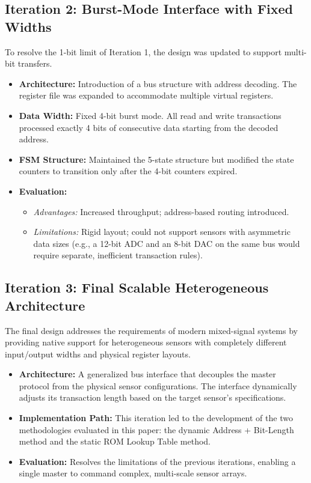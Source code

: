 \documentclass[conference]{IEEEtran}
\begin{document}
\subsection{Iteration 2: Burst-Mode Interface with Fixed Widths}
To resolve the 1-bit limit of Iteration 1, the design was updated to support multi-bit transfers.
\begin{itemize}
    \item \textbf{Architecture:} Introduction of a bus structure with address decoding. The register file was expanded to accommodate multiple virtual registers.
    \item \textbf{Data Width:} Fixed 4-bit burst mode. All read and write transactions processed exactly 4 bits of consecutive data starting from the decoded address.
    \item \textbf{FSM Structure:} Maintained the 5-state structure but modified the state counters to transition only after the 4-bit counters expired.
    \item \textbf{Evaluation:} 
        \begin{itemize}
            \item \textit{Advantages:} Increased throughput; address-based routing introduced.
            \item \textit{Limitations:} Rigid layout; could not support sensors with asymmetric data sizes (e.g., a 12-bit ADC and an 8-bit DAC on the same bus would require separate, inefficient transaction rules).
        \end{itemize}
\end{itemize}

\subsection{Iteration 3: Final Scalable Heterogeneous Architecture}
The final design addresses the requirements of modern mixed-signal systems by providing native support for heterogeneous sensors with completely different input/output widths and physical register layouts.
\begin{itemize}
    \item \textbf{Architecture:} A generalized bus interface that decouples the master protocol from the physical sensor configurations. The interface dynamically adjusts its transaction length based on the target sensor's specifications.
    \item \textbf{Implementation Path:} This iteration led to the development of the two methodologies evaluated in this paper: the dynamic Address + Bit-Length method and the static ROM Lookup Table method.
    \item \textbf{Evaluation:} Resolves the limitations of the previous iterations, enabling a single master to command complex, multi-scale sensor arrays.
\end{itemize}
\end{document}
